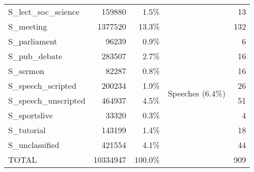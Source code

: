 {\begin{center}
\begin{tabular}{lrrcr}
        S\_lect\_soc\_science       & 159880   & 1.5\%   &                                     & 13    \\ \cline{4-4}
        S\_meeting                  & 1377520  & 13.3\%  &                                     & 132   \\
        S\_parliament               & 96239    & 0.9\%   &                                     & 6     \\
        S\_pub\_debate              & 283507   & 2.7\%   &                                     & 16    \\
        S\_sermon                   & 82287    & 0.8\%   &                                     & 16    \\ \cline{4-4}
        S\_speech\_scripted         & 200234   & 1.9\%   & \multirow{2}{*}{Speeches (6.4\%)}   & 26    \\
        S\_speech\_unscripted       & 464937   & 4.5\%   &                                     & 51    \\ \cline{4-4}
        S\_sportslive               & 33320    & 0.3\%   &                                     & 4     \\
        S\_tutorial                 & 143199   & 1.4\%   &                                     & 18    \\
        S\_unclassified             & 421554   & 4.1\%   &                                     & 44    \\ \hline
        TOTAL                       & 10334947 & 100.0\% &                                     & 909   \\ \hline
    \end{tabular}
\end{center}
}



